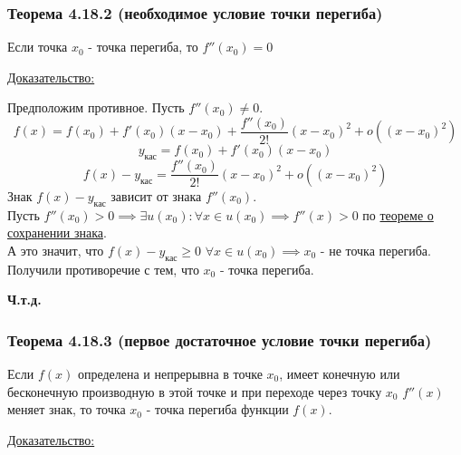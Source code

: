 \documentclass[12pt]{article}
\begin{document}
    \subsubsection*{Теорема 4.18.2 (необходимое условие точки перегиба)}\label{th:4.18.2}
    Если точка $x_0$ - точка перегиба, то $f''(x_0) = 0$\par\noindent
    \underline{Доказательство:}
    \begin{adjustwidth}{1.5em}{1.5em}
        Предположим противное. Пусть $f''(x_0) \ne 0$.
        \[ f(x) = f(x_0) + f'(x_0)(x-x_0) + \frac{f''(x_0)}{2!}(x-x_0)^2 + o((x-x_0)^2) \]
        \[ y_{\text{кас}} = f(x_0) + f'(x_0)(x-x_0) \]
        \[ f(x)-y_{\text{кас}} = \boxed{\frac{f''(x_0)}{2!}(x-x_0)^2} + o((x-x_0)^2) \]
        Знак $f(x) - y_{\text{кас}}$ зависит от знака $f''(x_0)$.\\
        Пусть $f''(x_0) > 0 \implies \exists u(x_0) : \forall x \in u(x_0) \implies f''(x) > 0$ по \hyperref[th:3.3.2]{теореме о сохранении знака}.\\
        А это значит, что $f(x) - y_{\text{кас}} \ge 0$ $\forall x \in u(x_0) \implies x_0$ - не точка перегиба.\\
        Получили противоречие с тем, что $x_0$ - точка перегиба.
        \begin{center}
            \textbf{Ч.т.д.}
        \end{center}
    \end{adjustwidth}

    \subsubsection*{Теорема 4.18.3 (первое достаточное условие точки перегиба)}\label{th:4.18.3}
    Если $f(x)$ определена и непрерывна в точке $x_0$, имеет конечную или бесконечную производную в этой точке и при переходе через точку $x_0$ $f''(x)$ меняет знак, то точка $x_0$ - точка перегиба функции $f(x)$.\par\noindent
    \underline{Доказательство:}
    \begin{adjustwidth}{1.5em}{1.5em}
    \end{adjustwidth}
    
\end{document}
